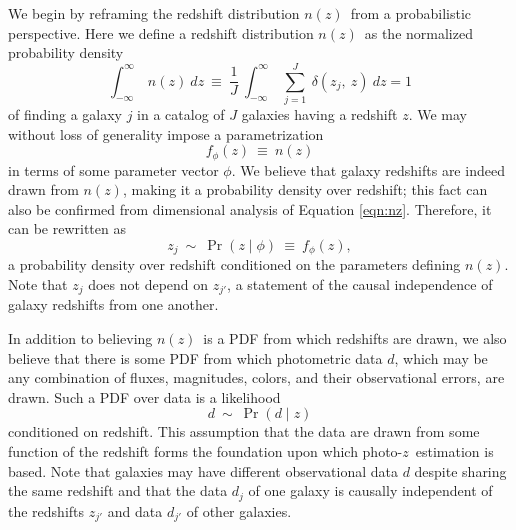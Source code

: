 \documentclass[iop]{emulateapj}
\newcommand{\nz}{$n(z)$}
\newcommand{\pz}{photo-$z$}
\begin{document}
We begin by reframing the redshift distribution \nz\ from a probabilistic 
perspective.
Here we define a redshift distribution \nz\ as the normalized probability 
density
\begin{equation}
\label{eqn:nz}
\int_{-\infty}^{\infty}\ n(z)\ dz\ \equiv\ \frac{1}{J}\ 
\int_{-\infty}^{\infty}\ \sum_{j=1}^{J}\ \delta(z_{j},\ z)\ dz = 1
\end{equation}
of finding a galaxy $j$ in a catalog of $J$ galaxies having a redshift $z$.
We may without loss of generality impose a parametrization
\begin{equation}
\label{eqn:fz}
f_{\phi}(z)\ \equiv\ n(z)
\end{equation}
in terms of some parameter vector $\phi$.
We believe that galaxy redshifts are indeed drawn from \nz, making it a 
probability density over redshift; this fact can also be confirmed from 
dimensional analysis of Equation \ref{eqn:nz}.
Therefore, it can be rewritten as
\begin{equation}
\label{eqn:pz}
z_{j}\ \sim\ \Pr(z \mid \phi)\ \equiv\ f_{\phi}(z),
\end{equation}
a probability density over redshift conditioned on the parameters defining \nz.
Note that $z_{j}$ does not depend on $z_{j'}$, a statement of the causal 
independence of galaxy redshifts from one another.

In addition to believing \nz\ is a PDF from which redshifts are drawn, we also 
believe that there is some PDF from which photometric data $d$, which may be 
any combination of fluxes, magnitudes, colors, and their observational errors, 
are drawn.
Such a PDF over data is a likelihood
\begin{equation}
\label{eqn:pzpdf}
d\ \sim\ \Pr(d \mid z)
\end{equation}
conditioned on redshift.
This assumption that the data are drawn from some function of the redshift 
forms the foundation upon which \pz\ estimation is based.
Note that galaxies may have different observational data $d$ despite sharing 
the same redshift and that the data $d_{j}$ of one galaxy is causally 
independent of the redshifts $z_{j'}$ and data $d_{j'}$ of other galaxies.
\end{document}
